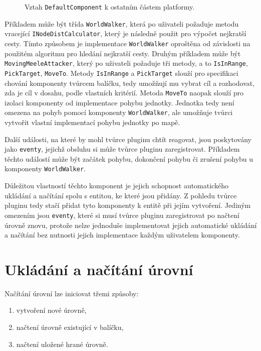 \begin{figure}[h]
	\centering
	\fontsize{8pt}{11pt}\selectfont
	\def\svgwidth{\textwidth}
	
	\caption{Vztah \texttt{DefaultComponent} k ostatním částem platformy.}
	\label{fig:defaultcomponentstructure}
\end{figure}


Příkladem může být třída \texttt{WorldWalker}, která po uživateli požaduje metodu vracející \texttt{INodeDistCalculator}, který je následně použit pro výpočet nejkratší cesty. Tímto způsobem je implementace \texttt{WorldWalker} oproštěna od závislosti na použitém algoritmu pro hledání nejkratší cesty. Druhým příkladem může být \texttt{MovingMeeleAttacker}, který po uživateli požaduje tři metody, a to \texttt{IsInRange}, \texttt{PickTarget}, \texttt{MoveTo}. Metody \texttt{IsInRange} a \texttt{PickTarget} slouží pro specifikaci chování komponenty tvůrcem balíčku, tedy umožňují mu vybrat cíl a rozhodovat, zda je cíl v dosahu, podle vlastních kritérií. Metoda \texttt{MoveTo} naopak slouží pro izolaci komponenty od implementace pohybu jednotky. Jednotka tedy není omezena na pohyb pomocí komponenty \texttt{WorldWalker}, ale umožňuje tvůrci vytvořit vlastní implementací pohybu jednotky po mapě.

Další události, na které by mohl tvůrce pluginu chtít reagovat, jsou poskytovány jako \texttt{eventy}, jejichž obsluhu si může tvůrce pluginu zaregistrovat. Příkladem těchto událostí může být začátek pohybu, dokončení pohybu či zrušení pohybu u komponenty \texttt{WorldWalker}.

Důležitou vlastností těchto komponent je jejich schopnost automatického ukládání a načítání spolu s entitou, ke které jsou přidány. Z pohledu tvůrce pluginu tedy stačí přidat tyto komponenty k entitě při jejím vytvoření. Jediným omezením jsou \texttt{eventy}, které si musí tvůrce pluginu zaregistrovat po načtení úrovně znovu, protože nelze jednoduše implementovat jejich automatické ukládání a načítání bez nutnosti jejich implementace každým uživatelem komponenty. 

\section{Ukládání a načítání úrovní}
\label{sec:loading}

Načítání úrovní lze iniciovat třemi způsoby:
\begin{enumerate}
	\item vytvoření nové úrovně,
	\item načtení úrovně existující v balíčku,
	\item načtení uložené hrané úrovně.
\end{enumerate}

